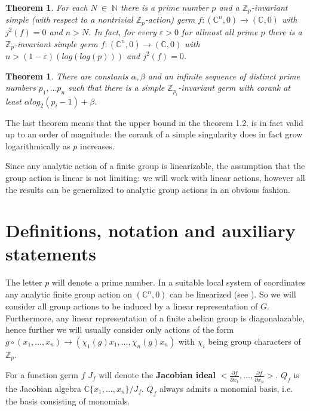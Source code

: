 \documentclass{amsart}
\newtheorem{theorem}[subsection]{Theorem}
\begin{document}
\begin{theorem} 

For each $N \: \in \; \mathbb{N}$ there is a prime number $p$ and a $\mathbb{Z}_p$-invariant simple (with respect to a nontrivial $\mathbb{Z}_p$-action) germ $f: (\mathbb{C}^n, 0) \longrightarrow  (\mathbb{C}, 0)$ with $j^2(f)=0$ and $n>N$. In fact, for every $\varepsilon>0$ for allmost all prime $p$ there is a $\mathbb{Z}_p$-invariant simple germ $f: (\mathbb{C}^n, 0) \longrightarrow  (\mathbb{C}, 0)$ with $n>(1-\varepsilon)(log(log(p)))$ and $j^2(f)=0$.

\end{theorem}


\begin{theorem}There are constants $\alpha, \beta$ and an infinite sequence of distinct prime numbers $p_1, \ldots p_n$ such that there is a simple $\mathbb{Z}_{p_i}$-invariant germ with corank at least $\alpha log_2 (p_i - 1) + \beta$.

\end{theorem}

The last theorem means that the upper bound in the theorem 1.2. is in fact valid up to an order of magnitude: the corank of a simple singularity does in fact grow logarithmically as $p$ increases. 

Since any analytic action of a finite group is linearizable, the assumption that the group action is linear is not limiting: we will work with linear actions, however all the results can be generalized to analytic group actions in an obvious fashion.

\section{Definitions, notation  and auxiliary statements}
The letter $p$ will denote a prime number.
In a suitable local system of coordinates any analytic finite group action on $(\mathbb{C}^n,0)$ can be linearized (see \cite{2}). So we will consider all group actions to be induced by a linear representation of $G$.
Furthermore, any linear representation of a finite abelian group is diagonalazable, hence further we will usually consider only actions of the form $g \circ (x_1,\ldots ,x_n) \longrightarrow (\chi_1(g) x_1,\ldots , \chi_n(g) x_n)$ with $\chi_i$ being group characters of $\mathbb{Z}_p$.


For a function germ $f$ $J_f$ will denote the \textbf{Jacobian ideal} $<\frac{\partial f}{\partial x_1}, \ldots, \frac{\partial f}{\partial x_n}>$.
$Q_f$ is the Jacobian algebra $\mathbb{C}\{x_1, \ldots, x_n\} / J_f$. $Q_f$ always admits a monomial basis, i.e. the basis consisting of monomials.
\end{document}
